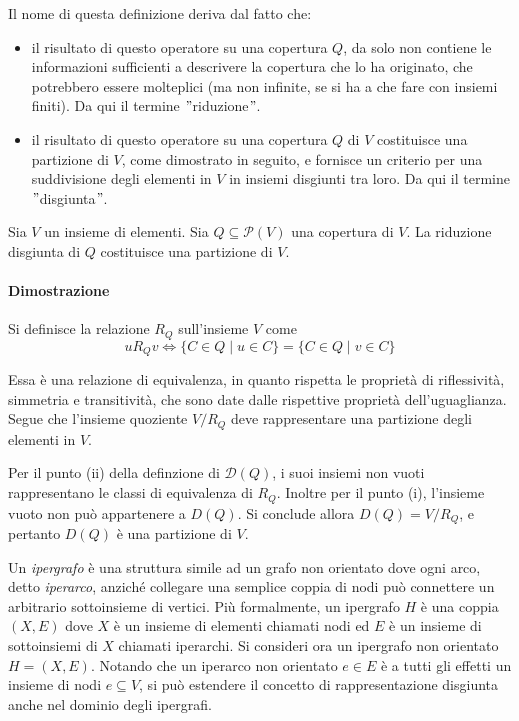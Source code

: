 Il nome di questa definizione deriva dal fatto che:
\begin{itemize}
    \item il risultato di questo operatore su una copertura $Q$, da solo non contiene le informazioni sufficienti a
        descrivere la copertura che lo ha originato, che potrebbero essere molteplici (ma non infinite, se si ha a che
        fare con insiemi finiti). %
        Da qui il termine \("\)riduzione\("\).
    \item il risultato di questo operatore su una copertura $Q$ di $V$ costituisce una partizione di $V$, come
        dimostrato in seguito, e fornisce un criterio per una suddivisione degli elementi in $V$ in insiemi disgiunti
        tra loro.
        Da qui il termine \("\)disgiunta\("\).
\end{itemize}

\newpage

\begin{proposition}
Sia $V$ un insieme di elementi. Sia $Q \subseteq \mathcal{P}(V)$ una copertura di $V$.
La riduzione disgiunta di $Q$ costituisce una partizione di $V$.
\end{proposition}

\paragraph{Dimostrazione}
Si definisce la relazione $R_Q$ sull'insieme $V$ come
\begin{equation*}
    uR_{Q}v \Leftrightarrow \{C \in Q \mid u \in C\} = \{C \in Q \mid v \in C\}
\end{equation*}

Essa \`e una relazione di equivalenza, in quanto rispetta le propriet\`a di riflessivit\`a, simmetria e transitivit\`a,
che sono date dalle rispettive propriet\`a dell'uguaglianza.
Segue che l'insieme quoziente $V/R_{Q}$ deve rappresentare una partizione degli elementi in $V$.

Per il punto (ii) della definzione di $\mathcal{D}(Q)$, i suoi insiemi non vuoti rappresentano le classi di equivalenza
di $R_Q$.
Inoltre per il punto (i), l'insieme vuoto non pu\`o appartenere a $D(Q)$.
Si conclude allora $D(Q) = V/R_{Q}$, e pertanto $D(Q)$ \`e una partizione di $V$.


Un \textit{ipergrafo} è una struttura simile ad un grafo non orientato dove ogni arco, detto \textit{iperarco},
anziché collegare una semplice coppia di nodi può connettere un arbitrario sottoinsieme di vertici.
Più formalmente, un ipergrafo $H$ è una coppia $(X, E)$ dove $X$ è un insieme di elementi chiamati nodi ed $E$ è
un insieme di sottoinsiemi di $X$ chiamati iperarchi.
Si consideri ora un ipergrafo non orientato $H = (X, E)$.
Notando che un iperarco non orientato $e \in E$ è a tutti gli effetti un insieme di nodi $e \subseteq V$,
si pu\`o estendere il concetto di rappresentazione disgiunta anche nel dominio degli ipergrafi.

